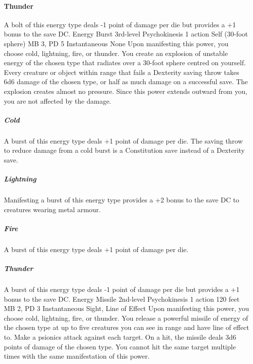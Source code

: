 \paragraph{Thunder} A bolt of this energy type deals -1 point
of damage per die but provides a +1 bonus to the save DC.
\DndPowerHeader%
    {Energy Burst\label{pwr:energy_burst}}
    {3rd-level Psychokinesis}
    {1 action}
    {Self (30-foot sphere)}
    {MB 3, PD 5}
    {Instantaneous}
    {None}
Upon manifesting this power, you choose cold,
lightning, fire, or thunder. You create an explosion of unstable
energy of the chosen type that radiates over a 30-foot sphere
centred on yourself. Every creature or object within range
that fails a Dexterity saving throw takes 6d6 damage of the
chosen type, or half as much damage on a successful save.
The explosion creates almost no pressure. Since this power
extends outward from you, you are not affected by the damage.

\subparagraph{Cold} A burst of this energy type deals +1 point
of damage per die. The saving throw to reduce damage from
a cold burst is a Constitution save instead of a Dexterity
save.

\subparagraph{Lightning} Manifesting a burst of this energy
type provides a +2 bonus to the save DC to creatures wearing
metal armour.

\subparagraph{Fire} A burst of this energy type deals +1 point
of damage per die.

\subparagraph{Thunder} A burst of this energy type deals -1
point of damage per die but provides a +1 bonus to the save
DC.
\DndPowerHeader%
    {Energy Missile\label{pwr:energy_missile}}
    {2nd-level Psychokinesis}
    {1 action}
    {120 feet}
    {MB 2, PD 3}
    {Instantaneous}
    {Sight, Line of Effect}
Upon manifesting this power, you choose cold,
lightning, fire, or thunder. You release a powerful missile
of energy of the chosen type at up to five creatures you can
see in range and have line of effect to. Make a psionics attack
against each target. On a hit, the missile deals 3d6 points
of damage of the chosen type. You cannot hit the same target
multiple times with the same manifestation of this power.

